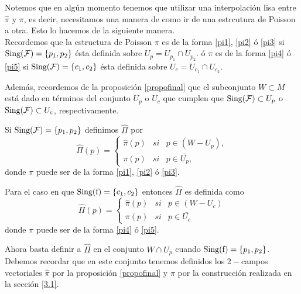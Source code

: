 \documentclass[a4paper,10pt]{book}
\begin{document}
Notemos que en alg\'un momento tenemos que utilizar una interpolaci\'on lisa entre $\hat{\pi}$ y $\pi$, es decir, necesitamos una manera de como ir de una estrcutura de Poisson a otra. Esto lo hacemos de la siguiente manera.\\

Recordemos que la estructura de Poisson $\pi$ es de la forma \ref{pi1}, \ref{pi2} \'o \ref{pi3} si ${\rm Sing(\mathcal{F})}=\{p_{1},p_{2}\}$ \'esta definida sobre $U_{p}=U_{p_{1}}\cap U_{p_{2}}$. \'o $\pi$ es de la forma \ref{pi4} \'o \ref{pi5} si ${\rm Sing(\mathcal{F})}=\{c_{1},c_{2}\}$ \'esta definida sobre $U_{c}=U_{c_{1}}\cap U_{c_{2}}$.
\vspace{5mm}

Adem\'as, recordemos de la proposici\'on \ref{propofinal} que el subconjunto $W\subset M$ est\'a dado en t\'erminos del conjunto $U_{p}$ o $U_{c}$ que cumplen que ${\rm Sing(\mathcal{F})}\subset U_{p}$ o ${\rm Sing(\mathcal{F})}\subset U_{c}$, respectivamente.
\vspace{5mm}

Si ${\rm Sing(\mathcal{F})}=\{p_{1},p_{2}\}$ definimos $\hat{\Pi}$ por 
\begin{equation}\label{pigorro1}
    \hat{\Pi}(p) = \left\{ \begin{array}{lcl}
                         \hat{\pi}(p) &   si  & p\in (W-{U_{p}}),\\
                         \pi(p)       &   si  & p\in \bar{U_{p}},
                         \end{array}
                \right.
\end{equation}
donde $\pi$ puede ser de la forma \ref{pi1}, \ref{pi2} \'o \ref{pi3}.
\vspace{5mm}

Para el caso en que ${\rm Sing(f)}=\{c_{1},c_{2}\}$ entonces $\hat{\Pi}$ es definida como 
\begin{equation}\label{pigorro2}
    \hat{\Pi}(p) = \left\{ \begin{array}{lcc}
                         \hat{\pi}(p) &   si  & p\in (W-{U_{c}})\\
                         \pi(p)       &   si  & p\in \bar{U_{c}}
                         \end{array}
                \right.
\end{equation}
donde $\pi$ puede ser de la forma \ref{pi4} \'o \ref{pi5}.                
\vspace{5mm}

Ahora basta definir a $\hat{\Pi}$ en el conjunto $W\cap U_{p}$ cuando ${\rm Sing(f)}=\{p_{1},p_{2}\}$. Debemos recordar que en este conjunto tenemos definidos los $2-$campos vectoriales $\hat{\pi}$ por la proposici\'on \ref{propofinal} y $\pi$ por la construcci\'on realizada en la secci\'on \ref{3.1}.
\vspace{5mm}
\end{document}
